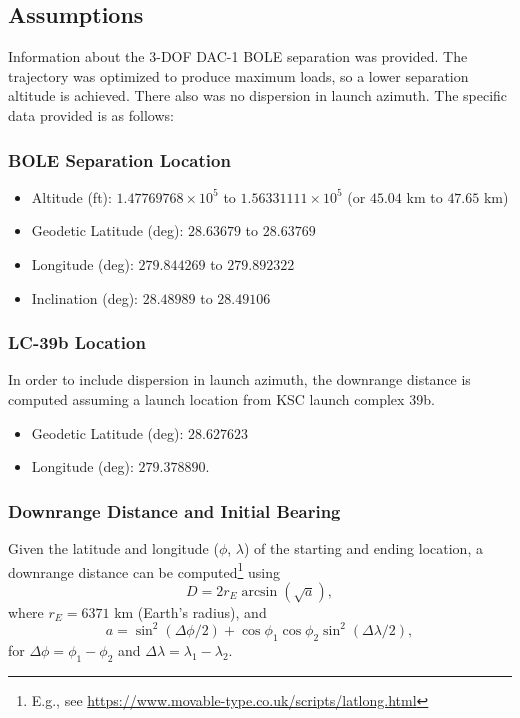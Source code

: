 \documentclass{hitec}
\begin{document}
\subsection{Assumptions}\label{ssec:Assumptions}

Information about the 3-DOF DAC-1 BOLE separation was provided. %
The trajectory was optimized to produce maximum loads, so a lower separation altitude is achieved. There also was no dispersion in launch azimuth. The specific data provided is as follows:
\subsubsection{BOLE Separation Location}
\begin{itemize}
	\item Altitude (ft): $1.47769768\times 10^5$ to $1.56331111\times 10^5$ (or $45.04$ km to $47.65$ km)
	\item Geodetic Latitude (deg): $28.63679$ to $28.63769$
	\item Longitude (deg): $279.844269$ to $279.892322$
	\item Inclination (deg): $28.48989$ to $28.49106$
\end{itemize}


\subsubsection{LC-39b Location}
In order to include dispersion in launch azimuth, the downrange distance is computed assuming a launch location from KSC launch complex 39b.
\begin{itemize}
	\item Geodetic Latitude (deg): $28.627623$
	\item Longitude (deg): $279.378890$.
\end{itemize}

\subsubsection{Downrange Distance and Initial Bearing}
Given the latitude and longitude ($\phi$, $\lambda$) of the starting and ending location, a downrange distance can be computed\footnote{E.g., see \url{https://www.movable-type.co.uk/scripts/latlong.html}} using
\begin{equation}
	D = 2r_E\arcsin(\sqrt{a}),
\end{equation}
where $r_E = 6371$ km (Earth's radius), and
\begin{equation}
	a = \sin^2(\Delta\phi/2) + \cos\phi_1\cos\phi_2\sin^2(\Delta\lambda/2),
\end{equation}
for $\Delta\phi = \phi_1-\phi_2$ and $\Delta\lambda = \lambda_1-\lambda_2$.
\end{document}
